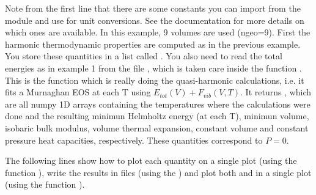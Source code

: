 \documentclass[letterpaper,10pt,english]{sphinxmanual}
\begin{document}
\begin{sphinxVerbatim}[commandchars=\\\{\}]
   
  
\PYG{p}{[}\PYG{p}{]}  
\PYG{p}{[}\PYG{p}{]}  

\PYG{p}{[}\PYG{p}{]}  

\end{sphinxVerbatim}

Note from the first line that there are some constants you can import from the module and use for unit conversions. See the documentation for more details on which ones are available.
In this example, 9 volumes are used (ngeo=9). First the harmonic thermodynamic properties are computed as in the previous example. You store these quantities in a list called . You also need to read the total energies as in example 1 from the file , which is taken care inside the function . This is the function which is really doing the quasi-harmonic calculations, i.e. it fits a Murnaghan EOS at each T using \(E_{tot}(V)+F_{vib}(V,T)\). It returns , which are all numpy 1D arrays containing the temperatures where the calculations were done and the resulting minimun Helmholtz energy (at each T), minimun volume, isobaric bulk modulus, volume thermal expansion, constant volume and constant pressure heat capacities, respectively. These quantities correspond to \(P=0\).

The following lines show how to plot each quantity on a single plot (using the function ), write the results in files (using the ) and plot both  and  in a single plot (using the function ).
\end{document}
